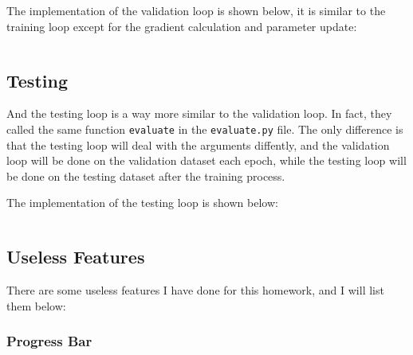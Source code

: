 The implementation of the validation loop is shown below, it is similar to the training loop except for the gradient calculation and parameter update:

\inputminted[firstline=7]{python}{../src/evaluate.py}

\subsection{Testing}

And the testing loop is a way more similar to the validation loop.
In fact, they called the same function \texttt{evaluate} in the \texttt{evaluate.py} file.
The only difference is that the testing loop will deal with the arguments diffently, and the validation loop will be done on the validation dataset each epoch, while the testing loop will be done on the testing dataset after the training process.

The implementation of the testing loop is shown below:

\inputminted[firstline=17, lastline=36]{python}{../src/inference.py}

\subsection{Useless Features}

There are some useless features I have done for this homework, and I will list them below:

\subsubsection{Progress Bar}

